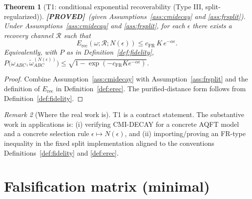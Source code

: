 \documentclass[11pt]{article}
\newtheorem{theorem}{Theorem}[section]
\theoremstyle{definition}
\theoremstyle{remark}
\newtheorem{remark}[theorem]{Remark}
\newcommand{\PROVED}{\textcolor{green!60!black}{\textbf{[PROVED]}}}
\newcommand{\Erec}{E_{\mathrm{rec}}}
\newcommand{\cR}{\mathcal{R}}
\begin{document}
\begin{theorem}[T1: conditional exponential recoverability (Type III,
split-regularized)]
\label{thm:contract}
\PROVED\ (given Assumptions~\ref{ass:cmidecay} and \ref{ass:frsplit}).
Under Assumptions~\ref{ass:cmidecay} and \ref{ass:frsplit}, for each
$\epsilon$ there exists a recovery channel $\cR$ such that
\[
\Erec(\omega; \cR; N(\epsilon)) \le c_{\mathrm{FR}}\, K\,
e^{-\alpha\epsilon}.
\]
Equivalently, with $P$ as in Definition~\ref{def:fidelity},
$P\bigl(\omega_{ABC}, \widetilde{\omega}^{(N(\epsilon))}_{ABC}\bigr) \le
\sqrt{1 - \exp(-c_{\mathrm{FR}} K e^{-\alpha\epsilon})}$.
\end{theorem}

\begin{proof}
Combine Assumption~\ref{ass:cmidecay} with Assumption~\ref{ass:frsplit}
and the definition of $\Erec$ in Definition~\ref{def:erec}. The
purified-distance form follows from Definition~\ref{def:fidelity}.
\end{proof}

\begin{remark}[Where the real work is]
\label{rem:realwork}
T1 is a contract statement. The substantive work in applications is: (i)
verifying CMI-DECAY for a concrete AQFT model and a concrete selection
rule $\epsilon \mapsto N(\epsilon)$, and (ii) importing/proving an
FR-type inequality in the fixed split implementation aligned to the
conventions Definitions~\ref{def:fidelity} and \ref{def:erec}.
\end{remark}

\section{Falsification matrix (minimal)}
\end{document}
